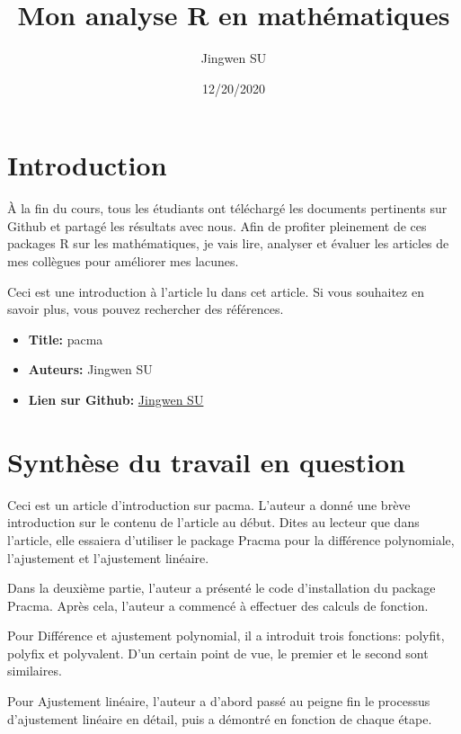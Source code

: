 \documentclass[
]{article}
\title{Mon analyse R en mathématiques}
\author{Jingwen SU}
\date{12/20/2020}
\providecommand{\tightlist}{%
  \setlength{\itemsep}{0pt}\setlength{\parskip}{0pt}}
\begin{document}
\maketitle

\hypertarget{introduction}{%
\section{Introduction}\label{introduction}}

À la fin du cours, tous les étudiants ont téléchargé les documents
pertinents sur Github et partagé les résultats avec nous. Afin de
profiter pleinement de ces packages R sur les mathématiques, je vais
lire, analyser et évaluer les articles de mes collègues pour améliorer
mes lacunes.

Ceci est une introduction à l'article lu dans cet article. Si vous
souhaitez en savoir plus, vous pouvez rechercher des références.

\begin{itemize}
\tightlist
\item
  \textbf{Title:} pacma
\item
  \textbf{Auteurs:} Jingwen SU
\item
  \textbf{Lien sur Github:}
  \href{https://github.com/Jingwen-su/PSBX/blob/main/Document\%20final/gr01_Jingwen_SU_pacman.pdf}{Jingwen
  SU}
\end{itemize}

\hypertarget{synthuxe8se-du-travail-en-question}{%
\section{Synthèse du travail en
question}\label{synthuxe8se-du-travail-en-question}}

Ceci est un article d'introduction sur pacma. L'auteur a donné une brève
introduction sur le contenu de l'article au début. Dites au lecteur que
dans l'article, elle essaiera d'utiliser le package Pracma pour la
différence polynomiale, l'ajustement et l'ajustement linéaire.

Dans la deuxième partie, l'auteur a présenté le code d'installation du
package Pracma. Après cela, l'auteur a commencé à effectuer des calculs
de fonction.

Pour Différence et ajustement polynomial, il a introduit trois
fonctions: polyfit, polyfix et polyvalent. D'un certain point de vue, le
premier et le second sont similaires.

Pour Ajustement linéaire, l'auteur a d'abord passé au peigne fin le
processus d'ajustement linéaire en détail, puis a démontré en fonction
de chaque étape.
\end{document}
